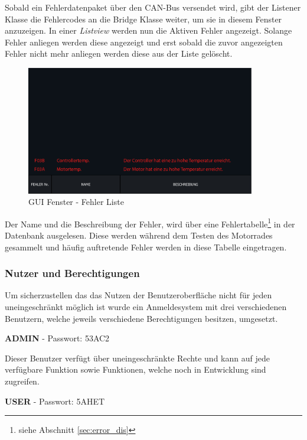 Sobald ein Fehlerdatenpaket über den CAN-Bus versendet wird, gibt der Listener Klasse die Fehlercodes an die Bridge Klasse weiter, um sie in diesem Fenster anzuzeigen. In einer \textit{Listview} werden nun die Aktiven Fehler angezeigt. Solange Fehler anliegen werden diese angezeigt und erst sobald die zuvor angezeigten Fehler nicht mehr anliegen werden diese aus der Liste gelöscht.

\begin{figure}[H]
	\begin{center}
		\includegraphics[width=10cm]{figures/hcis/window_error.png}
			\caption{GUI Fenster - Fehler Liste}
			\label{fig:pageError}
	\end{center}
\end{figure}

Der Name und die Beschreibung der Fehler, wird über eine Fehlertabelle\footnote{siehe Abschnitt \ref{sec:error_dis} } in der Datenbank ausgelesen. Diese werden während dem Testen des Motorrades gesammelt und häufig auftretende Fehler werden in diese Tabelle eingetragen. 

\subsubsection{Nutzer und Berechtigungen} \label{sec:users}

Um sicherzustellen das das Nutzen der Benutzeroberfläche nicht für jeden uneingeschränkt möglich ist wurde ein Anmeldesystem mit drei verschiedenen Benutzern, welche jeweils verschiedene Berechtigungen besitzen, umgesetzt.

{\small \textbf{ADMIN}} - Passwort: 53AC2\\ \vspace{2mm}


Dieser Benutzer verfügt über uneingeschränkte Rechte und kann auf jede verfügbare Funktion sowie Funktionen, welche noch in Entwicklung sind zugreifen.

{\small \textbf{USER}} - Passwort: 5AHET\\ \vspace{2mm}

